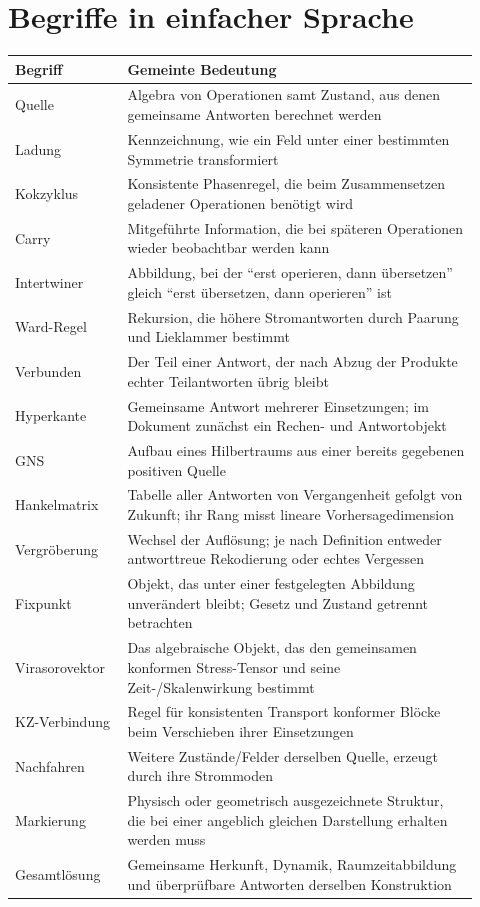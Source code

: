 \section{Begriffe in einfacher Sprache}
\begin{longtable}{L{0.22\linewidth}L{0.70\linewidth}}
\toprule
Begriff & Gemeinte Bedeutung\\\midrule\endhead
Quelle & Algebra von Operationen samt Zustand, aus denen gemeinsame Antworten berechnet werden\\
Ladung & Kennzeichnung, wie ein Feld unter einer bestimmten Symmetrie transformiert\\
Kokzyklus & Konsistente Phasenregel, die beim Zusammensetzen geladener Operationen benötigt wird\\
Carry & Mitgeführte Information, die bei späteren Operationen wieder beobachtbar werden kann\\
Intertwiner & Abbildung, bei der ``erst operieren, dann übersetzen'' gleich ``erst übersetzen, dann operieren'' ist\\
Ward-Regel & Rekursion, die höhere Stromantworten durch Paarung und Lieklammer bestimmt\\
Verbunden & Der Teil einer Antwort, der nach Abzug der Produkte echter Teilantworten übrig bleibt\\
Hyperkante & Gemeinsame Antwort mehrerer Einsetzungen; im Dokument zunächst ein Rechen- und Antwortobjekt\\
GNS & Aufbau eines Hilbertraums aus einer bereits gegebenen positiven Quelle\\
Hankelmatrix & Tabelle aller Antworten von Vergangenheit gefolgt von Zukunft; ihr Rang misst lineare Vorhersagedimension\\
Vergröberung & Wechsel der Auflösung; je nach Definition entweder antworttreue Rekodierung oder echtes Vergessen\\
Fixpunkt & Objekt, das unter einer festgelegten Abbildung unverändert bleibt; Gesetz und Zustand getrennt betrachten\\
Virasorovektor & Das algebraische Objekt, das den gemeinsamen konformen Stress-Tensor und seine Zeit-/Skalenwirkung bestimmt\\
KZ-Verbindung & Regel für konsistenten Transport konformer Blöcke beim Verschieben ihrer Einsetzungen\\
Nachfahren & Weitere Zustände/Felder derselben Quelle, erzeugt durch ihre Strommoden\\
Markierung & Physisch oder geometrisch ausgezeichnete Struktur, die bei einer angeblich gleichen Darstellung erhalten werden muss\\
Gesamtlösung & Gemeinsame Herkunft, Dynamik, Raumzeitabbildung und überprüfbare Antworten derselben Konstruktion\\\bottomrule
\end{longtable}

